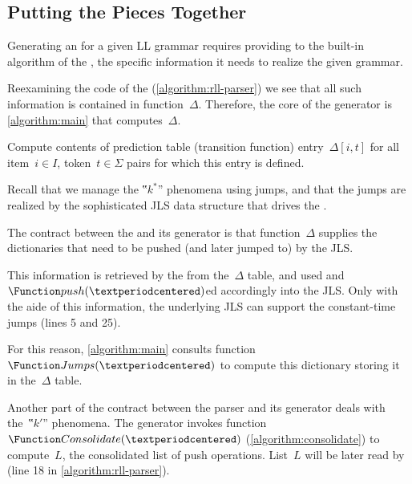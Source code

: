 \subsection{Putting the Pieces Together}
Generating an \RLLp for a given LL grammar requires providing to the
built-in algorithm of the \RLLp, the specific information it needs to
realize the given grammar.

Reexamining the code of the \RLLp (\cref{algorithm:rll-parser})
we see that all such information is contained in
function~$\Delta$.
Therefore, the core of the \RLLp generator is
\cref{algorithm:main} that computes~$\Delta$.

\begin{algorithm}[H]
  \caption{\label{algorithm:main}
    Compute contents of prediction table
    (transition function) entry~$Δ[i,t]$
    for all item~$i∈I$, token~$t ∈Σ$ pairs
    for which this entry is defined.
  }
  \begin{algorithmic}
     
        \CONTINUE {}
      \FI
           
           
        \FI
      \ENDFOR %
    \ENDFOR %
  \end{algorithmic}
\end{algorithm}

Recall that we manage the ‟$k^*$” phenomena using jumps, and that the
jumps are realized by the sophisticated JLS data structure that drives the
\RLLp.

The contract between the \RLLp and its generator is that function~$\Delta$
supplies the dictionaries that need to be pushed (and later jumped to)
by the JLS.

This information is retrieved by the \RLLp from the~$\Delta$ table,
and used and~$\Function push(·)$ed accordingly into the JLS.
Only with the aide of this information, the underlying JLS can support the
constant-time jumps (lines 5 and 25).

For this reason, \cref{algorithm:main} consults function~$\Function Jumps(·)$
to compute this dictionary storing it in the~$\Delta$ table.

Another part of the contract between the parser and its generator deals
with the~‟$k'$” phenomena. The generator invokes function~$\Function
Consolidate(·)$ (\cref{algorithm:consolidate}) to
compute~$L$, the consolidated list of push operations. List~$L$ will be later
read by \RLLp (line 18 in \cref{algorithm:rll-parser}).
